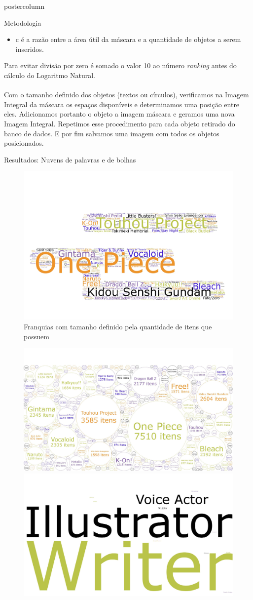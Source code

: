 \documentclass[final,hyperref={pdfpagelabels=false}]{beamer}
\begin{document}
\begin{frame}
\begin{columns}
\begin{column}{.49\textwidth}
\begin{beamercolorbox}[center,wd=\textwidth]{postercolumn}
\begin{minipage}[T]{.95\textwidth}
{\begin{block}{Metodologia}
\begin{itemize}  
  \item c é a razão entre a área útil da máscara e a quantidade de objetos a serem inseridos.
\end{itemize}
Para evitar divisão por zero é somado o valor 10 ao número \emph{ranking} antes do cálculo do Logaritmo Natural.\\
~\\
Com o tamanho definido dos objetos (textos ou círculos), verificamos na Imagem Integral da máscara os espaços disponíveis e determinamos uma posição entre eles. Adicionamos portanto o objeto a imagem máscara e geramos uma nova Imagem Integral. Repetimos esse procedimento para cada objeto retirado do banco de dados. E por fim salvamos uma imagem com todos os objetos posicionados. 
            \end{block}
            \vfill
            \begin{block}{Resultados: Nuvens de palavras e de bolhas}
            \begin{figure}[H]
            \includegraphics[width=0.8\linewidth]{Full_page_photo.pdf}
            \caption{Franquias com tamanho definido pela quantidade de itens que possuem} \label{collaborator}
             \end{figure}
             \begin{figure}[H]
             \includegraphics[width=0.5\linewidth]{collection_amount_bubbles.pdf} \includegraphics[width=0.5\linewidth]{writter.pdf}

\end{figure}
\end{block}}
\end{minipage}
\end{beamercolorbox}
\end{column}
\end{columns}
\end{frame}
\end{document}
